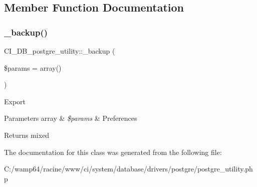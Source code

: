 \subsection{Member Function Documentation}
\mbox{\label{class_c_i___d_b__postgre__utility_a76f759352019ba4a1fdfd8337612a40e}} 
\subsubsection{\texorpdfstring{\+\_\+backup()}{\_backup()}}
{\footnotesize\ttfamily C\+I\+\_\+\+D\+B\+\_\+postgre\+\_\+utility\+::\+\_\+backup (\begin{DoxyParamCaption}\item[{}]{\$params = {\ttfamily array()} }\end{DoxyParamCaption})\hspace{0.3cm}{\ttfamily [protected]}}

Export


\begin{DoxyParams}[1]{Parameters}
array & {\em \$params} & Preferences \\
\hline
\end{DoxyParams}
\begin{DoxyReturn}{Returns}
mixed 
\end{DoxyReturn}


The documentation for this class was generated from the following file\+:\begin{DoxyCompactItemize}
\item 
C\+:/wamp64/racine/www/ci/system/database/drivers/postgre/postgre\+\_\+utility.\+php\end{DoxyCompactItemize}
